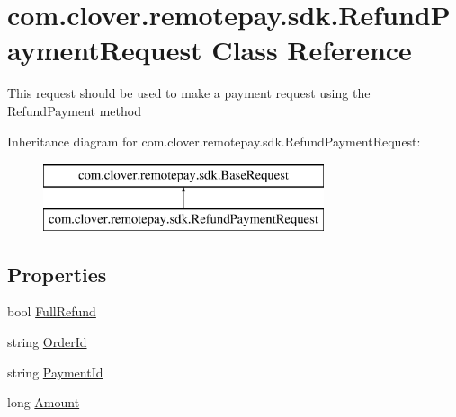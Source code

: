 \hypertarget{classcom_1_1clover_1_1remotepay_1_1sdk_1_1_refund_payment_request}{}\section{com.\+clover.\+remotepay.\+sdk.\+Refund\+Payment\+Request Class Reference}
\label{classcom_1_1clover_1_1remotepay_1_1sdk_1_1_refund_payment_request}


This request should be used to make a payment request using the Refund\+Payment method  


Inheritance diagram for com.\+clover.\+remotepay.\+sdk.\+Refund\+Payment\+Request\+:\begin{figure}[H]
\begin{center}
\leavevmode
\includegraphics[height=2.000000cm]{classcom_1_1clover_1_1remotepay_1_1sdk_1_1_refund_payment_request}
\end{center}
\end{figure}
\subsection*{Properties}
\begin{DoxyCompactItemize}
\item 
bool \hyperlink{classcom_1_1clover_1_1remotepay_1_1sdk_1_1_refund_payment_request_aa01e28327a3f52c1bf0cd7fc33efdd42}{Full\+Refund}
\item 
string \hyperlink{classcom_1_1clover_1_1remotepay_1_1sdk_1_1_refund_payment_request_ae75bc272ad1898e519d7c7c40dcbf05f}{Order\+Id}
\item 
string \hyperlink{classcom_1_1clover_1_1remotepay_1_1sdk_1_1_refund_payment_request_a4cf837d718d5fc7cca845909072e8822}{Payment\+Id}
\item 
long \hyperlink{classcom_1_1clover_1_1remotepay_1_1sdk_1_1_refund_payment_request_aa8ce46b848c4cfe2bea40299246c3274}{Amount}
\end{DoxyCompactItemize}
